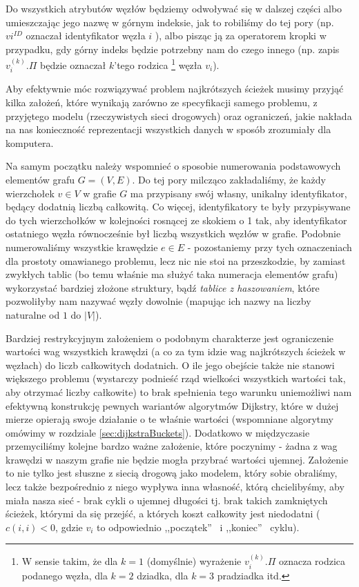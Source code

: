 Do wszystkich atrybutów węzłów będziemy odwoływać się w dalszej części albo umieszczając jego nazwę w górnym indeksie, jak to robiliśmy do tej pory (np. $v{i}^{ID}$ oznaczał identyfikator węzła $i$ ), albo pisząc ją za operatorem kropki w przypadku, gdy górny indeks będzie potrzebny nam do czego innego (np. zapis $v_{i}^{ \left( k \right) }.\Pi$ będzie oznaczał $k$'tego rodzica \footnote{W sensie takim, że dla $k=1$ (domyślnie) wyrażenie $v_{i}^{ \left( k \right) }.\Pi$ oznacza rodzica podanego węzła, dla $k=2$ dziadka, dla $k=3$ pradziadka itd.} węzła $v_{i}$).

Aby efektywnie móc rozwiązywać problem najkrótszych ścieżek musimy przyjąć kilka założeń, które wynikają zarówno ze specyfikacji samego problemu, z przyjętego modelu (rzeczywistych sieci drogowych) oraz ograniczeń, jakie nakłada na nas konieczność reprezentacji wszystkich danych w sposób zrozumiały dla komputera.

Na samym początku należy wspomnieć o sposobie numerowania podstawowych elementów grafu $G = \left( V, E \right)$. Do tej pory milcząco zakładaliśmy, że każdy wierzchołek $v \in V$ w grafie $G$ ma przypisany swój własny, unikalny identyfikator, będący dodatnią liczbą całkowitą. Co więcej, identyfikatory te były przypisywane do tych wierzchołków w kolejności rosnącej ze skokiem o 1 tak, aby identyfikator ostatniego węzła równocześnie był liczbą wszystkich węzłów w grafie. Podobnie numerowaliśmy wszystkie krawędzie $e \in E$ - pozostaniemy przy tych oznaczeniach dla prostoty omawianego problemu, lecz nic nie stoi na przeszkodzie, by zamiast zwykłych tablic (bo temu właśnie ma służyć taka numeracja elementów grafu) wykorzystać bardziej złożone struktury, bądź \textit{tablice z haszowaniem}, które pozwoliłyby nam nazywać węzły dowolnie (mapując ich nazwy na liczby naturalne od $1$ do $ \left| V \right| $).

Bardziej restrykcyjnym założeniem o podobnym charakterze jest ograniczenie wartości wag wszystkich krawędzi (a co za tym idzie wag najkrótszych ścieżek w węzłach) do liczb całkowitych dodatnich. O ile jego obejście także nie stanowi większego problemu (wystarczy podnieść rząd wielkości wszystkich wartości tak, aby otrzymać liczby całkowite) to brak spełnienia tego warunku uniemożliwi nam efektywną konstrukcję pewnych wariantów algorytmów Dijkstry, które w dużej mierze opierają swoje działanie o te właśnie wartości (wspomniane algorytmy omówimy w rozdziale \ref{sec:dijkstraBuckets}). Dodatkowo w międzyczasie przemyciliśmy kolejne bardzo ważne założenie, które poczynimy - żadna z wag krawędzi w naszym grafie nie będzie mogła przybrać wartości ujemnej. Założenie to nie tylko jest słuszne z siecią drogową jako modelem, który sobie obraliśmy, lecz także bezpośrednio z niego wypływa inna własność, którą chcielibyśmy, aby miała nasza sieć - brak cykli o ujemnej długości tj. brak takich zamkniętych ścieżek, którymi da się przejść, a których koszt całkowity jest niedodatni ($ c \left( i, i \right) < 0 $, gdzie $v_{i}$ to odpowiednio ,,początek''~ i ,,koniec''~ cyklu). 

